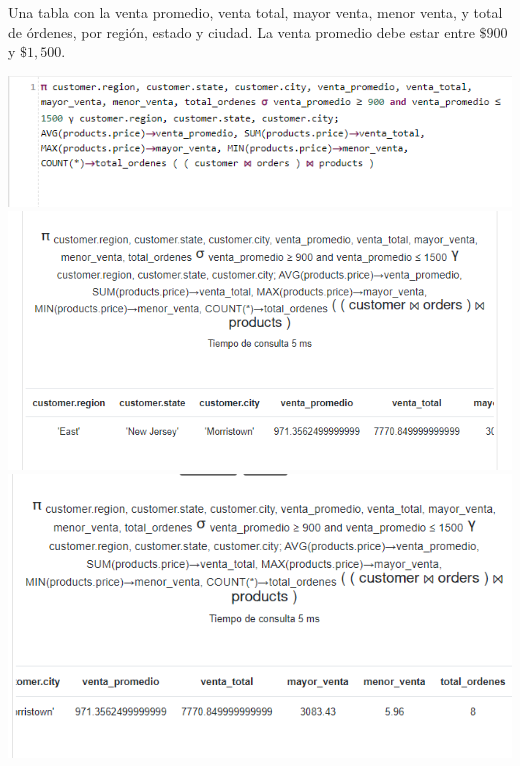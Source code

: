 Una tabla con la venta promedio, venta total, mayor venta, menor venta, y total de órdenes, por región, estado y
ciudad. La venta promedio debe estar entre $ \$900$ y $\$1,500.$

\includegraphics[width= 15cm]{resources/2h-1.png}
\vspace{0.15cm}
\includegraphics[width= 15cm]{resources/2h-2.png}
\vspace{0.15cm}
\includegraphics[width= 15cm]{resources/2h-3.png}